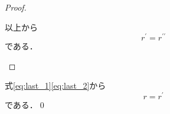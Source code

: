 \begin{enumerate}[(1)]
\begin{enumerate}[(i)]
\begin{proof}
\begin{itemize}
                以上から
                \begin{equation}
                    r^\prime=r^{\prime\prime}\label{eq:last_2}
                \end{equation}
                である．
            \end{itemize}
        \end{proof}
        式\eqref{eq:last_1}\eqref{eq:last_2}から
        \begin{equation}
            r=r^{\prime}
        \end{equation}
        である．\qed
    \end{enumerate}
\end{enumerate}

